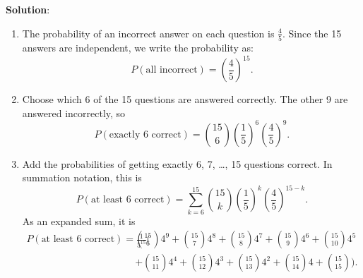 \documentclass{article}
\begin{document}
\textbf{Solution}:
\begin{enumerate}[label=(\alph*)]
  \item The probability of an incorrect answer on each question is
  $\frac{4}{5}$. Since the 15 answers are independent, we write the probability as:
  $$
  P(\text{all incorrect})=\left(\frac{4}{5}\right)^{15}.
  $$

  \item Choose which 6 of the 15 questions are answered correctly.
  The other 9 are answered incorrectly, so
  $$
  P(\text{exactly 6 correct})
  =\binom{15}{6}
   \left(\frac{1}{5}\right)^6
   \left(\frac{4}{5}\right)^9.
  $$

  \item Add the probabilities of getting exactly 6, 7, \ldots, 15
  questions correct. In summation notation, this is
  $$
  P(\text{at least 6 correct})
  =\sum_{k=6}^{15}\binom{15}{k}
   \left(\frac{1}{5}\right)^k
   \left(\frac{4}{5}\right)^{15-k}.
  $$
  As an expanded sum, it is
  $$
  \begin{aligned}
  P(\text{at least 6 correct})
  =\frac{1}{5^{15}}\bigl(
    &\binom{15}{6}4^9
    +\binom{15}{7}4^8
    +\binom{15}{8}4^7
    +\binom{15}{9}4^6
    +\binom{15}{10}4^5\\
    &+\binom{15}{11}4^4
    +\binom{15}{12}4^3
    +\binom{15}{13}4^2
    +\binom{15}{14}4
    +\binom{15}{15}
  \bigr).
  \end{aligned}
  $$
\end{enumerate}
\end{document}
